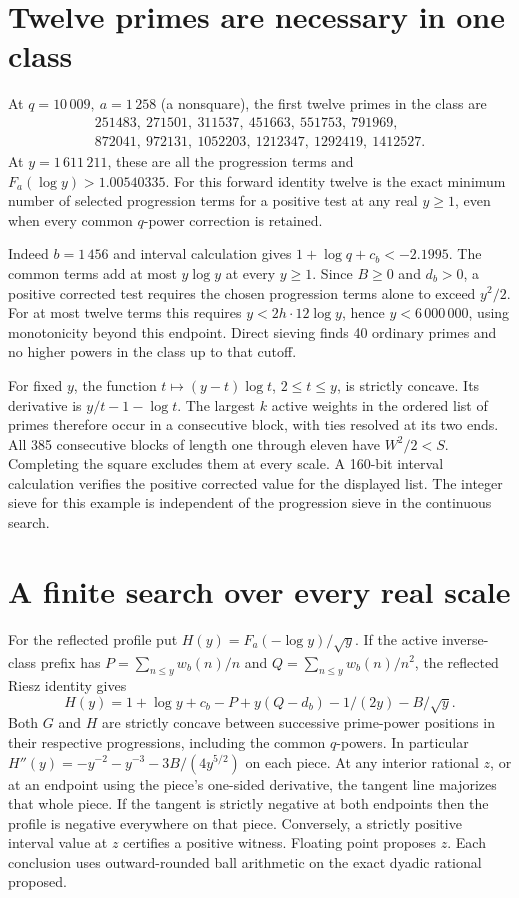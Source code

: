 \documentclass[11pt,a4paper]{article}
\newcommand{\head}[1]{\section*{\color{ink}#1}}
\begin{document}
\newpage
\head{Twelve primes are necessary in one class}
At \(q=10\,009,\ a=1\,258\) (a nonsquare), the first twelve primes in the class are
\[
\begin{gathered}
251483,\ 271501,\ 311537,\ 451663,\ 551753,\ 791969,\\
872041,\ 972131,\ 1052203,\ 1212347,\ 1292419,\ 1412527 .
\end{gathered}
\]
At \(y=1\,611\,211\), these are all the progression terms and
\(F_a(\log y)>1.00540335\). For this forward identity twelve is the exact
minimum number of selected progression terms for a positive test at any
real \(y\ge1\), even when every common \(q\)-power correction is retained.

Indeed \(b=1\,456\) and interval calculation gives
\(1+\log q+c_b<-2.1995\). The common terms add at most \(y\log y\) at every
\(y\ge1\). Since \(B\ge0\) and \(d_b>0\), a positive corrected test requires
the chosen progression terms alone to exceed \(y^2/2\). For at most twelve
terms this requires \(y<2h\cdot12\log y\), hence \(y<6\,000\,000\), using
monotonicity beyond this endpoint. Direct sieving finds 40 ordinary primes
and no higher powers in the class up to that cutoff.

For fixed \(y\), the function \(t\mapsto (y-t)\log t\), \(2\le t\le y\), is
strictly concave. Its derivative is \(y/t-1-\log t\). The largest \(k\)
active weights in the ordered list of primes therefore occur in a consecutive
block, with ties resolved at its two ends. All 385 consecutive blocks of
length one through eleven have \(W^2/2<S\). Completing the square excludes
them at every scale. A 160-bit interval calculation verifies the positive
corrected value for the displayed list. The integer sieve for this example
is independent of the progression sieve in the continuous search.

\head{A finite search over every real scale}
For the reflected profile put \(H(y)=F_a(-\log y)/\sqrt y\). If the active
inverse-class prefix has \(P=\sum_{n\le y}w_b(n)/n\) and
\(Q=\sum_{n\le y}w_b(n)/n^2\), the reflected Riesz identity gives
\[
 H(y)=1+\log y+c_b-P+y(Q-d_b)-1/(2y)-B/\sqrt y .
\]
Both \(G\) and \(H\) are strictly concave between successive prime-power
positions in their respective progressions, including the common \(q\)-powers.
In particular \(H''(y)=-y^{-2}-y^{-3}-3B/(4y^{5/2})\) on each piece.
At any interior rational \(z\), or at an endpoint using the piece's one-sided
derivative, the tangent line majorizes that whole piece. If the tangent is
strictly negative at both endpoints then the profile is negative everywhere
on that piece. Conversely, a strictly positive interval value at \(z\)
certifies a positive witness. Floating point proposes \(z\). Each conclusion
uses outward-rounded ball arithmetic on the exact dyadic rational proposed.
\end{document}
